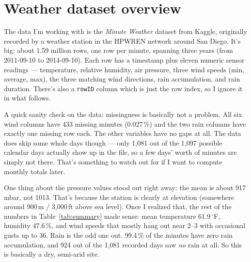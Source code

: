 
\section{Weather dataset overview}
\label{sec:data}

The data I'm working with is the \emph{Minute Weather} dataset from Kaggle, originally recorded by a weather station in the HPWREN network around San Diego. It's big: about 1.59 million rows, one row per minute, spanning three years (from 2011-09-10 to 2014-09-10). Each row has a timestamp plus eleven numeric sensor readings --- temperature, relative humidity, air pressure, three wind speeds (min, average, max), the three matching wind directions, rain accumulation, and rain duration. There's also a \texttt{rowID} column which is just the row index, so I ignore it in what follows.

A quick sanity check on the data: missingness is basically not a problem. All six wind columns have 433 missing minutes (0.027\,\%) and the two rain columns have exactly one missing row each. The other variables have no gaps at all. The data does skip some whole days though --- only 1{,}081 out of the 1{,}097 possible calendar days actually show up in the file, so a few days' worth of minutes are simply not there. That's something to watch out for if I want to compute monthly totals later.

One thing about the pressure values stood out right away: the mean is about 917\,mbar, not 1013. That's because the station is clearly at elevation (somewhere around 900\,m / 3{,}000\,ft above sea level). Once I realized that, the rest of the numbers in Table~\ref{tab:summary} made sense: mean temperature 61.9\,$^{\circ}$F, humidity 47.6\,\%, and wind speeds that mostly hang out near 2--3 with occasional gusts up to 36. Rain is the odd one out. 99.4\,\% of the minutes have zero rain accumulation, and 924 out of the 1{,}081 recorded days saw \emph{no} rain at all. So this is basically a dry, semi-arid site.

